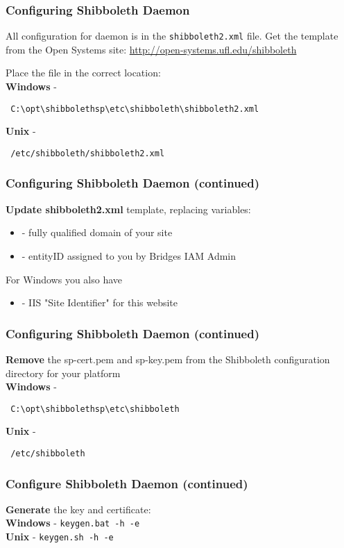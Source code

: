 \begin{frame}[fragile]
\frametitle{Configuring Shibboleth Daemon}
All configuration for daemon is in the \texttt{shibboleth2.xml} file. Get the template from the Open Systems site:
\url{http://open-systems.ufl.edu/shibboleth}
\bigskip

Place the file in the correct location: \\ \bigskip
\textbf{Windows} - \begin{verbatim} C:\opt\shibbolethsp\etc\shibboleth\shibboleth2.xml \end{verbatim}
\textbf{Unix} - \begin{verbatim} /etc/shibboleth/shibboleth2.xml \end{verbatim}
\end{frame}

\begin{frame}
\frametitle{Configuring Shibboleth Daemon (continued)}
\textbf{Update shibboleth2.xml} template, replacing variables: \\
\begin{itemize}
\item {} - fully qualified domain of your site 
\item {} - entityID assigned to you by Bridges IAM Admin
\end{itemize}
For Windows you also have
\begin{itemize}
\item {} - IIS "Site Identifier" for this website
\end{itemize}
\end{frame}

\begin{frame}[fragile]
\frametitle{Configuring Shibboleth Daemon (continued)}
\textbf{Remove} the sp-cert.pem and sp-key.pem from the Shibboleth configuration directory for your platform \\ \bigskip
\textbf{Windows} - \begin{verbatim} C:\opt\shibbolethsp\etc\shibboleth \end{verbatim}
\textbf{Unix} - \begin{verbatim} /etc/shibboleth \end{verbatim}
\end{frame}

\begin{frame}[fragile]
\frametitle{Configure Shibboleth Daemon (continued)}
\textbf{Generate} the key and certificate: \\ \bigskip
\textbf{Windows} - \texttt{keygen.bat -h  -e } \\
\bigskip
\textbf{Unix} - \texttt{keygen.sh -h  -e } \\
\end{frame}


